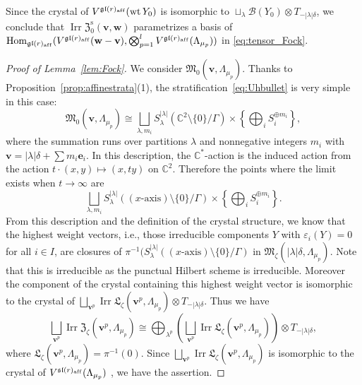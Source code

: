 \documentclass[pdftex]{sigma}
\theoremstyle{definition}
\numberwithin{equation}{section}
\newcommand{\lemref}[1]{Lemma~\ref{#1}}
\newcommand{\propref}[1]{Proposition~\ref{#1}}
\newcommand{\C}{{\mathbb C}}
\newcommand{\algsl}{\operatorname{\mathfrak{sl}}} %
\newcommand{\gl}{\operatorname{\mathfrak{gl}}}
\newcommand{\Hom}{\operatorname{Hom}}
\newcommand{\M}{{\mathfrak M}} %
\newcommand{\La}{{\mathfrak L}} %
\newcommand{\bv}{{\mathbf v}} %
\newcommand{\bw}{{\mathbf w}} %
\newcommand{\be}{{\mathbf e}}
\newcommand{\Irr}{\operatorname{Irr}}
\newcommand{\aff}{\mathrm{af\/f}}
\begin{document}
Since the crystal of $V^{\gl(r)_\aff}(\operatorname{wt} Y_0)$ is
isomorphic to $\sqcup_{\lambda} \mathscr B(Y_0)\otimes
T_{-|\lambda|\delta}$, we conclude that $\Irr
\mathfrak Z_0^{\operatorname{s}}(\bv,\bw)$ parametrizes a basis of
\(
  \Hom_{\gl(r)_\aff} (V^{\gl(r)_\aff}(\bw - \bv),
  \bigotimes_{p=1}^l
  V^{{\gl}(r)_\aff}(\Lambda_{\mu_p}))
\)
in \eqref{eq:tensor_Fock}.

\begin{proof}[Proof of \lemref{lem:Fock}]
We consider $\M_0(\bv,\Lambda_{\mu_p})$. Thanks to
\propref{prop:affinestrata}(1), the stratif\/ica\-tion~\eqref{eq:Uhbullet}
is very simple in this case:
\begin{equation*}
  \M_0(\bv,\Lambda_{\mu_p}) \cong
  \bigsqcup_{\lambda,m_i} S^{|\lambda|}_\lambda (\C^2\setminus\{0\}/\Gamma)
  \times \left\{\bigoplus_i S_i^{\oplus m_i}\right\},
\end{equation*}
where the summation runs over partitions $\lambda$ and nonnegative
integers $m_i$ with $\bv = |\lambda|\delta + \sum m_i \be_i$. In this
description, the $\C^*$-action is the induced action from the action
$t\cdot(x,y)\mapsto (x,ty)$ on $\C^2$. Therefore the points
where the limit exists when $t\to\infty$ are
\begin{equation*}
  \bigsqcup_{\lambda,m_i} S^{|\lambda|}_\lambda
  ((\text{$x$-axis}) \setminus\{0\}/\Gamma)
  \times \left\{\bigoplus_i S_i^{\oplus m_i}\right\}.
\end{equation*}
From this description and the def\/inition of the crystal structure, we
know that the highest weight vectors, i.e., those irreducible
components $Y$ with $\varepsilon_i(Y) = 0$ for all $i\in I$, are
closures of $\pi^{-1}(S^{|\lambda|}_\lambda ((\text{$x$-axis})
\setminus\{0\}/\Gamma)$ in
$\M_\zeta(|\lambda|\delta,\Lambda_{\mu_p})$.
%
Note that this is irreducible as the punctual Hilbert scheme is
irreducible.
%
Moreover the component of the crystal containing this highest weight
vector is isomorphic to the crystal of $\bigsqcup_{\bv^p} \Irr
\La_\zeta(\bv^p,\Lambda_{\mu_p})\otimes T_{-|\lambda|\delta}$.
%
Thus we have
\begin{equation*}
   \bigsqcup_{\bv^p} \Irr\mathfrak Z_\zeta(\bv^p,\Lambda_{\mu_p})
   \cong \bigoplus_{\lambda^p}
   \left(\bigsqcup_{\bv^p} \Irr \La_\zeta(\bv^p,\Lambda_{\mu_p})\right)
   \otimes T_{-|\lambda|\delta},
\end{equation*}
where $\La_\zeta(\bv^p,\Lambda_{\mu_p}){=} \pi^{-1}(0)$.
%
Since $\bigsqcup_{\bv^p} \Irr \La_\zeta(\bv^p,\Lambda_{\mu_p})$ is
isomorphic to the crystal of $V^{\algsl(r)_\aff}(\Lambda_{\mu_p})$
\cite{KS,Saito,Na-tensor}, we have the assertion.
\end{proof}
\end{document}

